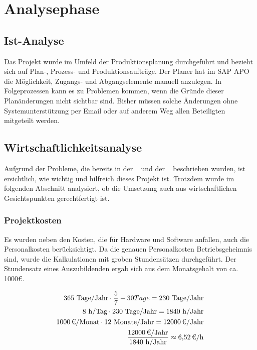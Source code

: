 \section{Analysephase} 
\label{sec:Analysephase}

\subsection{Ist-Analyse} 
\label{sec:IstAnalyse}
Das Projekt wurde im Umfeld der Produktionsplanung durchgeführt und bezieht sich auf Plan-, Prozess- und Produktionsaufträge. Der Planer hat im SAP \ac{APO} die	Möglichkeit, Zugangs- und Abgangselemente manuell anzulegen. In Folgeprozessen kann es zu Problemen kommen, wenn die Gründe dieser Planänderungen nicht sichtbar sind. Bisher müssen solche Änderungen ohne Systemunterstützung per Email oder auf anderem Weg allen Beteiligten mitgeteilt werden.

\subsection{Wirtschaftlichkeitsanalyse}
\label{sec:Wirtschaftlichkeitsanalyse}
Aufgrund der Probleme, die bereits in der ~ und der ~ beschrieben wurden, ist ersichtlich, wie wichtig und hilfreich dieses Projekt ist. Trotzdem wurde im folgenden Abschnitt analysiert, ob die Umsetzung auch aus wirtschaftlichen Gesichtspunkten gerechtfertigt ist.

\subsubsection{Projektkosten}
\label{sec:Projektkosten}
Es wurden neben den Kosten, die für Hardware und Software anfallen, auch die Personalkosten berücksichtigt. 
\newline
Da die genauen Personalkosten Betriebsgeheimnis sind, wurde die Kalkulationen mit groben Stundensätzen durchgeführt. Der Stundensatz eines Auszubildenden ergab sich aus dem Monatsgehalt von ca. 1000€.
		
\begin{eqnarray}
	365 \mbox{ Tage/Jahr} \cdot \frac{5}{7} - 30 Tage = 230 \mbox{ Tage/Jahr}\\
	8 \mbox{ h/Tag} \cdot 230 \mbox{ Tage/Jahr} = 1840 \mbox{ h/Jahr}\\
	\eur{1000}\mbox{/Monat} \cdot 12 \mbox{ Monate/Jahr} = \eur{12000} \mbox{/Jahr}\\
	\frac{\eur{12000} \mbox{/Jahr}}{1840 \mbox{ h/Jahr}} \approx \eur{6,52}\mbox{/h}
\end{eqnarray}
	
